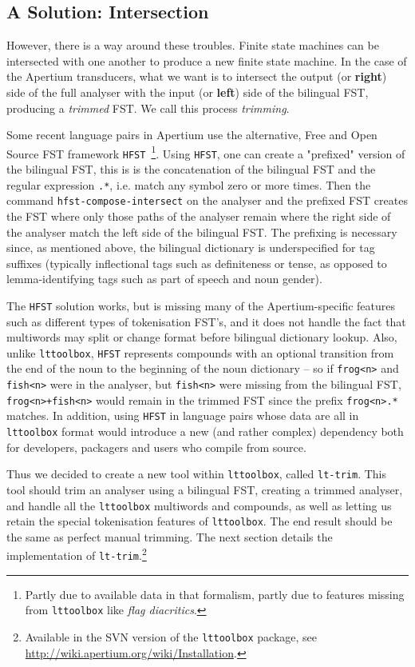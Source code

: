 \documentclass[10pt, a4paper]{article}
\newcommand{\ana}[1]{\texttt{#1}}
\newcommand{\tool}[1]{\texttt{#1}}
\begin{document}
\subsection{A Solution: Intersection}
\label{sec:solution}

However, there is a way around these troubles. Finite state machines
can be intersected with one another to produce a new finite state
machine. In the case of the Apertium transducers, what we want is to
intersect the output (or \textbf{right}) side of the full analyser
with the input (or \textbf{left}) side of the bilingual FST, producing
a \emph{trimmed} FST. We call this process \emph{trimming}.

Some recent language pairs in Apertium use the alternative, Free and
Open Source FST framework \tool{HFST}~\cite{linden2011hfst}\footnote{Partly
due to available data in that formalism, partly due to features
missing from \tool{lttoolbox} like \emph{flag diacritics}.}. Using
\tool{HFST}, one can create a "prefixed" version of the bilingual FST, this
is is the concatenation of the bilingual FST and the regular
expression \ana{.*}, i.e. match any symbol zero or more times. Then
the command \tool{hfst-compose-intersect} on the analyser and the
prefixed FST creates the FST where only those paths of the analyser
remain where the right side of the analyser match the left side of the
bilingual FST. The prefixing is necessary since, as mentioned above,
the bilingual dictionary is underspecified for tag suffixes (typically
inflectional tags such as definiteness or tense, as opposed to
lemma-identifying tags such as part of speech and noun gender).

The \tool{HFST} solution works, but is missing many of the
Apertium-specific features such as different types of tokenisation
FST's, and it does not handle the fact that multiwords may split or
change format before bilingual dictionary lookup. Also, unlike
\tool{lttoolbox}, \tool{HFST} represents compounds with an optional
transition from the end of the noun to the beginning of the noun
dictionary -- so if \ana{frog<n>} and \ana{fish<n>} were in the
analyser, but \ana{fish<n>} were missing from the bilingual FST,
\ana{frog<n>+fish<n>} would remain in the trimmed FST since the prefix
\ana{frog<n>.*} matches. In addition, using \tool{HFST} in language
pairs whose data are all in \tool{lttoolbox} format would introduce a
new (and rather complex) dependency both for developers, packagers and
users who compile from source.

Thus we decided to create a new tool within \tool{lttoolbox}, called
\tool{lt-trim}. This tool should trim an analyser using a bilingual
FST, creating a trimmed analyser, and handle all the \tool{lttoolbox}
multiwords and compounds, as well as letting us retain the special
tokenisation features of \tool{lttoolbox}. The end result should be
the same as perfect manual trimming. The next section details  the
implementation of \tool{lt-trim}.\footnote{Available in the SVN
version of the \tool{lttoolbox} package, see
\href{http://wiki.apertium.org/wiki/Installation}{http://wiki.apertium.org/wiki/Installation}.}
\end{document}

